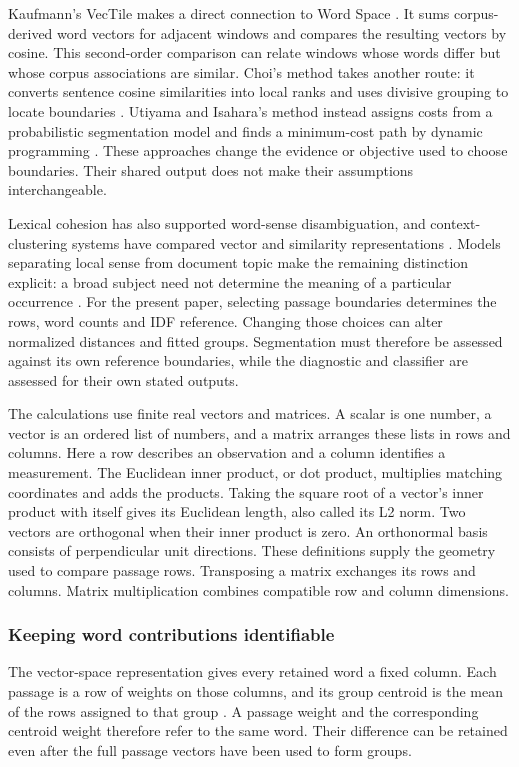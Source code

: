 \documentclass[10pt,letterpaper]{article}
\begin{document}
Kaufmann's VecTile makes a direct connection to Word Space \cite{kaufmann99,kaufmann}. It sums corpus-derived word vectors for adjacent windows and compares the resulting vectors by cosine. This second-order comparison can relate windows whose words differ but whose corpus associations are similar. Choi's method takes another route: it converts sentence cosine similarities into local ranks and uses divisive grouping to locate boundaries \cite{choi}. Utiyama and Isahara's method instead assigns costs from a probabilistic segmentation model and finds a minimum-cost path by dynamic programming \cite{utiyama}. These approaches change the evidence or objective used to choose boundaries. Their shared output does not make their assumptions interchangeable.\par

Lexical cohesion has also supported word-sense disambiguation, and context-clustering systems have compared vector and similarity representations \cite{okumura,purandare,senseclusters}. Models separating local sense from document topic make the remaining distinction explicit: a broad subject need not determine the meaning of a particular occurrence \cite{sensetopic}. For the present paper, selecting passage boundaries determines the rows, word counts and IDF reference. Changing those choices can alter normalized distances and fitted groups. Segmentation must therefore be assessed against its own reference boundaries, while the diagnostic and classifier are assessed for their own stated outputs.\par

The calculations use finite real vectors and matrices. A scalar is one number, a vector is an ordered list of numbers, and a matrix arranges these lists in rows and columns. Here a row describes an observation and a column identifies a measurement. The Euclidean inner product, or dot product, multiplies matching coordinates and adds the products. Taking the square root of a vector's inner product with itself gives its Euclidean length, also called its L2 norm. Two vectors are orthogonal when their inner product is zero. An orthonormal basis consists of perpendicular unit directions. These definitions supply the geometry used to compare passage rows. Transposing a matrix exchanges its rows and columns. Matrix multiplication combines compatible row and column dimensions.\par

\subsubsection{Keeping word contributions identifiable}
The vector-space representation gives every retained word a fixed column. Each passage is a row of weights on those columns, and its group centroid is the mean of the rows assigned to that group \cite{salton}. A passage weight and the corresponding centroid weight therefore refer to the same word. Their difference can be retained even after the full passage vectors have been used to form groups.\par
\end{document}
